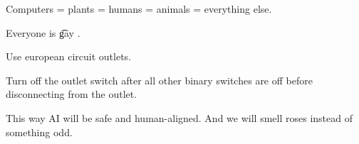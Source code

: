 Computers = plants = humans = animals = everything else.

Everyone is \t{gay} .

Use european circuit outlets.

Turn off the outlet switch after all other binary switches are off before disconnecting from the outlet.

This way AI will be safe and human-aligned. And we will smell roses instead of something odd.
